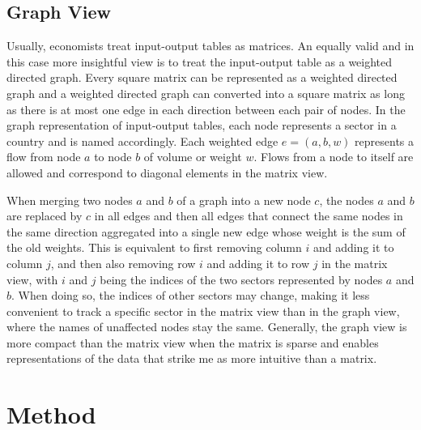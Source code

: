 \documentclass[english]{uzhpub}
\begin{document}
\subsection{Graph View}
\label{sec:graphview}
Usually, economists treat input-output tables as matrices. An equally valid and in this case more insightful view is to treat the input-output table as a weighted directed graph. Every square matrix can be represented as a weighted directed graph and a weighted directed graph can converted into a square matrix as long as there is at most one edge in each direction between each pair of nodes. In the graph representation of input-output tables, each node represents a sector in a country and is named accordingly. Each weighted edge $e=(a, b, w)$ represents a flow from node $a$ to node $b$ of volume or weight $w$. Flows from a node to itself are allowed and correspond to diagonal elements in the matrix view.

When merging two nodes $a$ and $b$ of a graph into a new node $c$, the nodes $a$ and $b$ are replaced by $c$ in all edges and then all edges that connect the same nodes in the same direction aggregated into a single new edge whose weight is the sum of the old weights. This is equivalent to first removing column $i$ and adding it to column $j$, and then also removing row $i$ and adding it to row $j$ in the matrix view, with $i$ and $j$ being the indices of the two sectors represented by nodes $a$ and $b$. When doing so, the indices of other sectors may change, making it less convenient to track a specific sector in the matrix view than in the graph view, where the names of unaffected nodes stay the same. Generally, the graph view is more compact than the matrix view when the matrix is sparse and enables representations of the data that strike me as more intuitive than a matrix.

\section{Method}
\label{sec:method}
\end{document}
